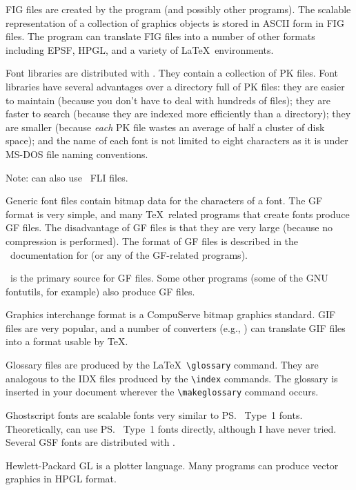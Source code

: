 \begin{iplist}{.25in}
\extitem [fig] FIG files are created by the  program (and
possibly other programs).  The scalable representation of a collection of
graphics objects is stored in ASCII form in FIG files.  The 
 program can translate FIG files into a number of
other formats including EPSF, HPGL, and a variety of \LaTeX\ environments.

\extitem [fli] Font libraries are distributed with \emTeX.  They contain a
collection of PK files.  Font libraries have several advantages over
a directory full of PK files: they are easier to maintain (because you
don't have to deal with hundreds of files); they are faster to search (because
they are indexed more efficiently than a directory); they are smaller
(because {\em each} PK file wastes an average of half a cluster of
disk space); and the name of each font is not limited to eight characters as
it is under MS-DOS file naming conventions.

Note:  can also use \emTeX\ FLI files.

\extitem [gf] Generic font files contain bitmap data for the characters of a
font.  The GF format is very simple, and many \TeX\ related programs that
create fonts produce GF files.  The disadvantage of GF files is that they are
very large (because no compression is performed).  The format of GF files is
described in the \web\ documentation for  (or any of the
GF-related  programs).  

\MF\ is the primary source for GF files.  Some other programs (some
of the GNU fontutils, for example) also produce GF files.

\extitem [gif] Graphics interchange format is a CompuServe bitmap graphics
standard.  GIF files are very popular, and a number of converters (e.g.,
) can translate GIF files into a format usable by \TeX.

\extitem [glo] Glossary files are produced by the \LaTeX\ \verb|\glossary|
command. They are analogous to the IDX files produced by the \verb|\index|
commands.  The glossary is inserted in your document wherever the
\verb|\makeglossary| command occurs.

\extitem [gsf] Ghostscript fonts are scalable fonts very similar
to \ps\ Type~1 fonts.  Theoretically,  can
use \ps\ Type~1 fonts directly, although I have never tried.
Several GSF fonts are distributed with .

\extitem [hpgl] Hewlett-Packard GL is a plotter language.  Many programs can
produce vector graphics in HPGL format.


\end{iplist}
